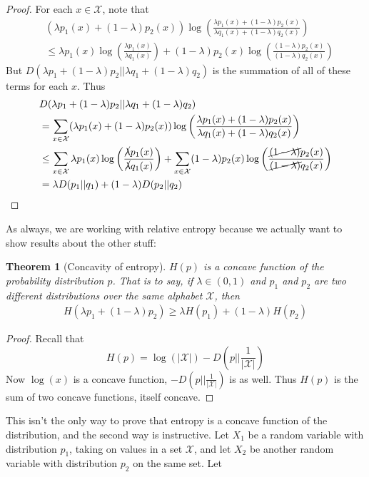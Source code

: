\documentclass{article}
\theoremstyle{definition}
\theoremstyle{plain}
\newtheorem{theorem}{Theorem}[section]
\begin{document}
\begin{proof}
	For each $x \in \mathcal{X}$, note that
\begin{align}
	& (\lambda p_1(x) + (1-\lambda)p_2(x))\log\left(\frac{\lambda p_1(x)+(1-\lambda)p_2(x)}{\lambda q_1(x) + (1-\lambda)q_2(x)} \right) \\
	&\leq \lambda p_1(x)\log\left(\frac{\lambda p_1(x)}{\lambda q_1(x)} \right) + (1-\lambda)p_2(x)\log\left(\frac{(1-\lambda)p_2(x)}{(1-\lambda)q_2(x)} \right) 
\end{align}
But $D(\lambda p_1 + (1-\lambda)p_2|| \lambda q_1 + (1-\lambda)q_2)$ is the summation of all of these terms for each $x$. Thus
\begin{align}
	& D(\lambda p_1 + (1-\lambda)p_2|| \lambda q_1 + (1-\lambda)q_2) \\ &= \sum_{x \in \mathcal{X}} (\lambda p_1(x) + (1-\lambda)p_2(x))\log\left(\frac{\lambda p_1(x)+(1-\lambda)p_2(x)}{\lambda q_1(x) + (1-\lambda)q_2(x)} \right) \\
	 &\leq \sum_{x \in \mathcal{X}} \lambda p_1(x)\log\left(\frac{\cancel{\lambda} p_1(x)}{\cancel{\lambda} q_1(x)} \right) + \sum_{x \in \mathcal{X}}(1-\lambda)p_2(x)\log\left(\frac{\cancel{(1-\lambda)}p_2(x)}{\cancel{(1-\lambda)}q_2(x)} \right) \\
	 &= \lambda D( p_1||q_1) + (1-\lambda) D( p_2 || q_2)
\end{align}
\end{proof}
As always, we are working with relative entropy because we actually want to show results about the other stuff:
\begin{theorem}[Concavity of entropy]
	$H(p)$ is a concave function of the probability distribution $p$. That is to say, if $\lambda \in (0,1)$ and $p_1$ and $p_2$ are two different distributions over the same alphabet $\mathcal{X}$, then 
\begin{align}
 H(\lambda p_1 + (1-\lambda)p_2) \geq \lambda H(p_1) + (1-\lambda)H(p_2) 
\end{align}
\end{theorem}
\begin{proof}
	Recall that
	\[	H(p) = \log(|\mathcal{X}|)-D\left( p||\frac{1}{|\mathcal{X}|} \right)\]
Now $\log(x)$ is a concave function, $-D(p||\frac{1}{|\mathcal{X}|})$ is as well. Thus $H(p)$ is the sum of two concave functions, itself concave. 
\end{proof}
This isn't the only way to prove that entropy is a concave function of the distribution, and the second way is instructive. Let $X_1$ be a random variable with distribution $p_1$, taking on values in a set $\mathcal{X}$, and let $X_2$ be another random variable with distribution $p_2$ on the same set. Let 
\end{document}
